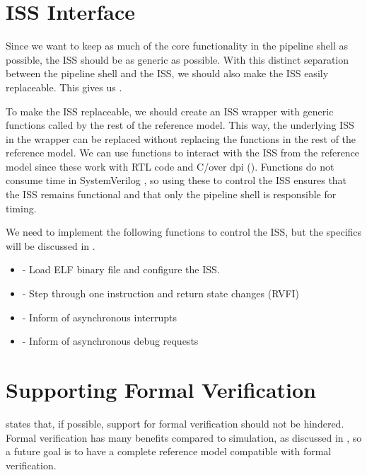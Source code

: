 \section{ISS Interface}

Since we want to keep as much of the core functionality in the pipeline shell as possible, the ISS should be as generic as possible. With this distinct separation between the pipeline shell and the ISS, we should also make the ISS easily replaceable. This gives us \textbf{}. 

To make the ISS replaceable, we should create an ISS wrapper with generic functions called by the rest of the reference model. This way, the underlying ISS in the wrapper can be replaced without replacing the functions in the rest of the reference model.
We can use functions to interact with the ISS from the reference model since these work with RTL code and C/\cpp over \acrfull{dpi} (). Functions do not consume time in SystemVerilog \cite{mehtaIntroductionSystemVerilog2021}, so using these to control the ISS ensures that the ISS remains functional and that only the pipeline shell is responsible for timing.

We need to implement the following functions to control the ISS, but the specifics will be discussed in .

\begin{itemize}
    \item {} - Load ELF binary file and configure the ISS.
    \item {} - Step through one instruction and return state changes (RVFI)
    \item {} - Inform of asynchronous interrupts
    \item {} - Inform of asynchronous debug requests
\end{itemize}




\section{Supporting Formal Verification}

 states that, if possible, support for formal verification should not be hindered. Formal verification has many benefits compared to simulation, as discussed in , so a future goal is to have a complete reference model compatible with formal verification.

